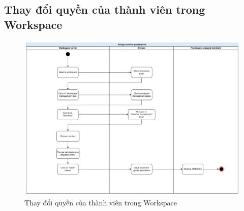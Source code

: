 \subsection{Thay đổi quyền của thành viên trong Workspace}
    \begin{figure}[H]
        \centering
        \includegraphics[width=\linewidth]{Content/Phân tích và thiết kế hệ thống/documents/Sơ đồ hoạt động/images/assignMemberPermission.png}
        \vspace{0.5cm}
        \caption{Thay đổi quyền của thành viên trong Workspace}
        \label{fig:Thay đổi quyền của thành viên trong Workspace}
    \end{figure}